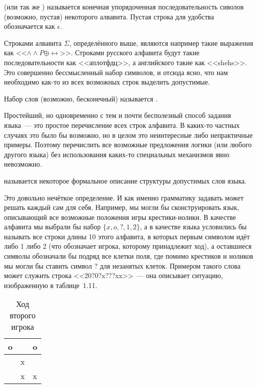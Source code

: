 \begin{definition}
 (или так же ) называется конечная упорядоченная последовательность сиволов (возможно, пустая) некоторого алвавита. Пустая строка для удобства обозначается как $\epsilon$.
\end{definition}

Строками алвавита $\Sigma$, определённого выше, являются например такие выражения как <<$\land\land P\oplus\leftrightarrow$>>. Строками русского алфавита будут такие последовательности как <<аплотфдц>>, а английского такие как <<shehs>>. Это совершенно бессмысленный набор символов, и отсюда ясно, что нам необходимо как-то из всех возможных строк выделить допустимые.

\begin{definition}
Набор слов (возможно, бесконечный) называется .
\end{definition}

Простейший, но одновременно с тем и почти бесполезный способ задания языка~--- это простое перечисление всех строк алфавита. В каких-то частных случаях это было бы возможно, но в целом это неинтересные либо непрактичные примеры. Поэтому перечислить все возможные предложения логики (или любого другого языка) без использования каких-то специальных механизмов явно невозможно.

\begin{exercise}
 называется некоторое формальное описание структуры допустимых слов языка.
\end{exercise}

Это довольно нечёткое определение. И как именно грамматику задавать может решать каждый сам для себя. Например, мы могли бы сконструировать язык, описывающий все возможные положения игры крестики-нолики. В качестве алфавита мы выбрали бы набор $\{x, o, ?,1, 2\}$, а в качестве языка условились бы называть все строки длины 10 этого алфавита, в которых первым символом идёт либо 1 либо 2 (что обозначает игрока, которому принадлежит ход), а оставшиеся символы обозначали бы подряд все клетки поля, где помимо крестиков и ноликов мы могли бы ставить символ $?$ для незанятых клеток. Примером такого слова может служить строка <<20?0?x???xx>>~--- она описывает ситуацию, изображенную в таблице~1.11.

\begin{table}[h]
\centering
\begin{tabular}{c | c | c}
o & & o\\
\hline
  & x & \\
\hline
 & x & x
\end{tabular}
\caption{Ход второго игрока}
\end{table}

